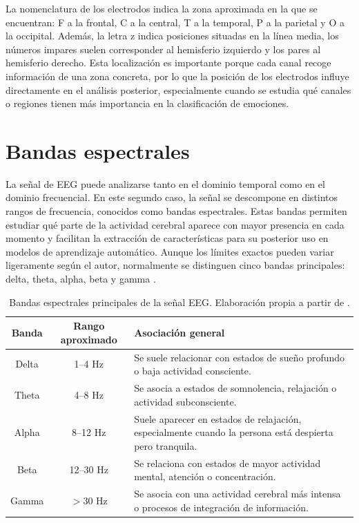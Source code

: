 La nomenclatura de los electrodos indica la zona aproximada en la que se encuentran: F a la frontal, C a la central, T a la temporal, P a la parietal y O a la occipital. Además, la letra z indica posiciones situadas en la línea media, los números impares suelen corresponder al hemisferio izquierdo y los pares al hemisferio derecho. Esta localización es importante porque cada canal recoge información de una zona concreta, por lo que la posición de los electrodos influye directamente en el análisis posterior, especialmente cuando se estudia qué canales o regiones tienen más importancia en la clasificación de emociones.

\section{Bandas espectrales}
\label{sec:bandas_espectrales}

La señal de \ac{EEG} puede analizarse tanto en el dominio temporal como en el dominio frecuencial. En este segundo caso, la señal se descompone en distintos rangos de frecuencia, conocidos como bandas espectrales. Estas bandas permiten estudiar qué parte de la actividad cerebral aparece con mayor presencia en cada momento y facilitan la extracción de características para su posterior uso en modelos de aprendizaje automático. Aunque los límites exactos pueden variar ligeramente según el autor, normalmente se distinguen cinco bandas principales: delta, theta, alpha, beta y gamma \cite{alarcao2019eeg}.

\begin{table}[H]
\centering
\begin{tabular}{|c|c|p{7cm}|}
\hline
\textbf{Banda} & \textbf{Rango aproximado} & \textbf{Asociación general} \\
\hline
Delta & 1--4 Hz & Se suele relacionar con estados de sueño profundo o baja actividad consciente. \\
\hline
Theta & 4--8 Hz & Se asocia a estados de somnolencia, relajación o actividad subconsciente. \\
\hline
Alpha & 8--12 Hz & Suele aparecer en estados de relajación, especialmente cuando la persona está despierta pero tranquila. \\
\hline
Beta & 12--30 Hz & Se relaciona con estados de mayor actividad mental, atención o concentración. \\
\hline
Gamma & $>$30 Hz & Se asocia con una actividad cerebral más intensa o procesos de integración de información. \\
\hline
\end{tabular}
\caption{Bandas espectrales principales de la señal EEG. Elaboración propia a partir de \cite{alarcao2019eeg}.}
\label{tab:bandas_eeg}
\end{table}

